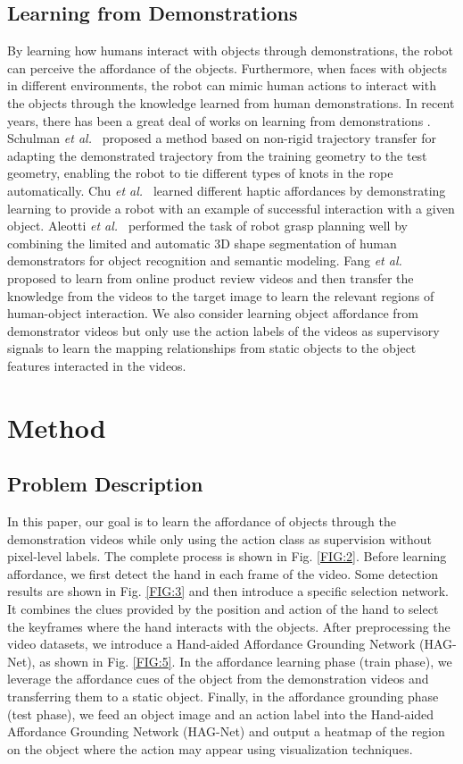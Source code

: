 \documentclass[journal,twoside]{IEEEtran}
\def\etal{{\em et al.~}}
\begin{document}
\subsection{Learning from Demonstrations}
By learning how humans interact with objects through demonstrations, the robot can perceive the affordance of the objects. Furthermore, when faces with objects in different environments, the robot can mimic human actions to interact with the objects through the knowledge learned from human demonstrations. In recent years, there has been a great deal of works on learning from demonstrations \cite{schulman2016learning,chu2016learning,aleotti2011part,zha2021contrastively,demo2vec2018cvpr}.  Schulman \etal \cite{schulman2016learning} proposed a method based on non-rigid trajectory transfer for adapting the demonstrated trajectory from the training geometry to the test geometry, enabling the robot to tie different types of knots in the rope automatically. Chu \etal \cite{chu2016learning} learned different haptic affordances by demonstrating learning to provide a robot with an example of successful interaction with a given object. Aleotti \etal \cite{aleotti2011part} performed the task of robot grasp planning well by combining the limited and automatic 3D shape segmentation of human demonstrators for object recognition and semantic modeling. Fang \etal \cite{demo2vec2018cvpr} proposed to learn from online product review videos and then transfer the knowledge from the videos to the target image to learn the relevant regions of human-object interaction. We also consider learning object affordance from demonstrator videos but only use the action labels of the videos as supervisory signals to learn the mapping relationships from static objects to the object features interacted in the videos.

\section{Method}
\subsection{Problem Description}
In this paper, our goal is to learn the affordance of objects through the demonstration videos while only using the action class as supervision without pixel-level labels. The complete process is shown in Fig. \ref{FIG:2}. Before learning affordance, we first detect the hand in each frame of the video. Some detection results are shown in Fig. \ref{FIG:3} and then introduce a specific selection network. It combines the clues provided by the position and action of the hand to select the keyframes where the hand interacts with the objects. After preprocessing the video datasets, we introduce a Hand-aided Affordance Grounding Network (HAG-Net), as shown in Fig. \ref{FIG:5}. In the affordance learning phase (train phase), we leverage the affordance cues of the object from the demonstration videos and transferring them to a static object. Finally, in the affordance grounding phase (test phase), we feed an object image and an action label into the Hand-aided Affordance Grounding Network (HAG-Net) and output a heatmap of the region on the object where the action may appear using visualization techniques.
\end{document}
